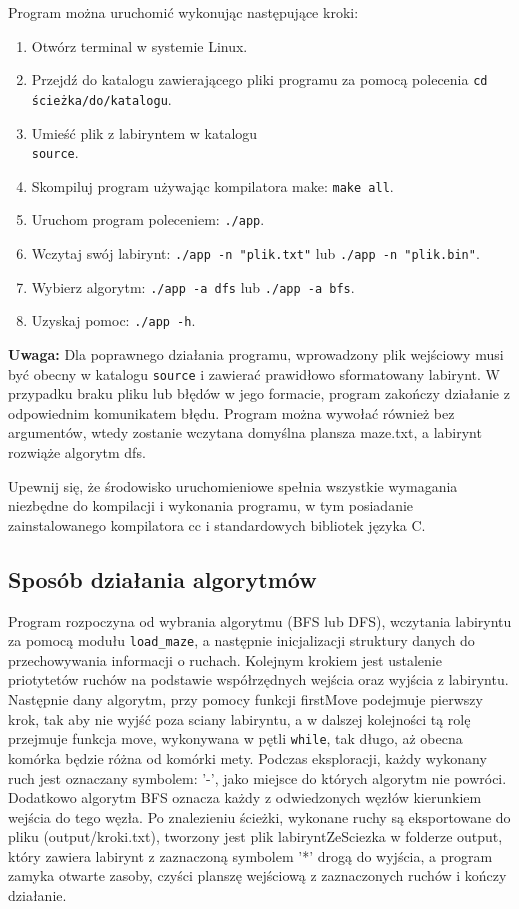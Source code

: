 \documentclass{article}
\begin{document}
Program można uruchomić wykonując następujące kroki:

\begin{enumerate}
    \item Otwórz terminal w systemie Linux.
    \item Przejdź do katalogu zawierającego pliki programu za pomocą polecenia \texttt{cd ścieżka/do/katalogu}.
    \item Umieść plik z labiryntem w katalogu \texttt{\\source}.
    \item Skompiluj program używając kompilatora make: \texttt{make all}.
    \item Uruchom program poleceniem: \texttt{./app}.
    \item Wczytaj swój labirynt: \texttt{./app -n "plik.txt"} lub \texttt{./app -n "plik.bin"}.
    \item Wybierz algorytm: \texttt{./app -a dfs} lub \texttt{./app -a bfs}.
    \item Uzyskaj pomoc: \texttt{./app -h}.
\end{enumerate}

\textbf{Uwaga:} Dla poprawnego działania programu, wprowadzony plik wejściowy musi być obecny w katalogu \texttt{source} i zawierać prawidłowo sformatowany labirynt. W przypadku braku pliku lub błędów w jego formacie, program zakończy działanie z odpowiednim komunikatem błędu. Program można wywołać również bez argumentów, wtedy zostanie wczytana domyślna plansza maze.txt, a labirynt rozwiąże algorytm dfs.

Upewnij się, że środowisko uruchomieniowe spełnia wszystkie wymagania niezbędne do kompilacji i wykonania programu, w tym posiadanie zainstalowanego kompilatora cc i standardowych bibliotek języka C.


\subsection{Sposób działania algorytmów }

Program rozpoczyna od wybrania algorytmu (BFS lub DFS), wczytania labiryntu za pomocą modułu \texttt{load\_maze}, a następnie inicjalizacji struktury danych do przechowywania informacji o ruchach. Kolejnym krokiem jest ustalenie priotytetów ruchów na podstawie współrzędnych wejścia oraz wyjścia z labiryntu. Następnie dany algorytm, przy pomocy funkcji firstMove podejmuje pierwszy krok, tak aby nie wyjść poza sciany labiryntu, a w dalszej kolejności tą rolę przejmuje funkcja move, wykonywana w pętli \texttt{while}, tak długo, aż obecna komórka będzie różna od komórki mety. Podczas eksploracji, każdy wykonany ruch jest oznaczany symbolem: '-', jako miejsce do których algorytm nie powróci. Dodatkowo algorytm BFS oznacza każdy z odwiedzonych węzłów kierunkiem wejścia do tego węzła. Po znalezieniu ścieżki, wykonane ruchy są eksportowane do pliku (output/kroki.txt), tworzony jest plik labiryntZeSciezka w folderze output, który zawiera labirynt z zaznaczoną symbolem '*' drogą do wyjścia, a program zamyka otwarte zasoby, czyści planszę wejściową z zaznaczonych ruchów i kończy działanie.
\end{document}
